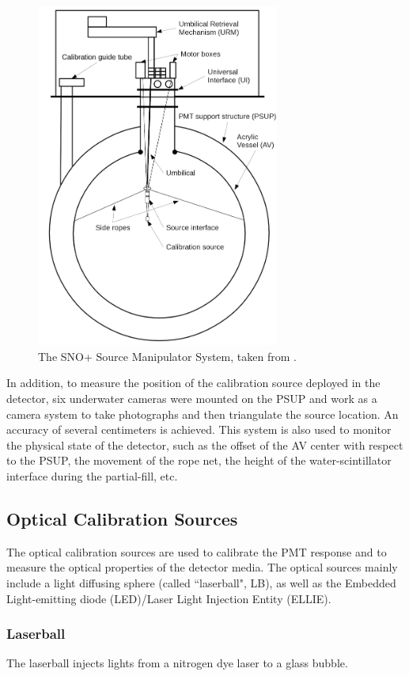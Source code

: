 \begin{figure}[!htb]
	\centering
	\includegraphics[width=8cm]{SMS.png}
	\caption{The SNO+ Source Manipulator System, taken from \cite{snop_jinst}.}
	\label{sms}
\end{figure}

In addition, to measure the position of the calibration source deployed in the detector, six underwater cameras were mounted on the PSUP and work as a camera system to take photographs and then triangulate the source location. An accuracy of several centimeters is achieved. This system is also used to monitor the physical state of the detector, such as the offset of the AV center with respect to the PSUP, the movement of the rope net, the height of the water-scintillator interface during the partial-fill, etc\cite{singh2020underwater,snop_jinst}.

\subsection{Optical Calibration Sources}
The optical calibration sources are used to calibrate the PMT response and to measure the optical properties of the detector media. The optical sources mainly include a light diffusing sphere (called ``laserball", LB), as well as the Embedded Light-emitting diode (LED)/Laser Light Injection Entity (ELLIE).

\subsubsection{Laserball}
The laserball injects lights from a nitrogen dye laser to a glass bubble.

